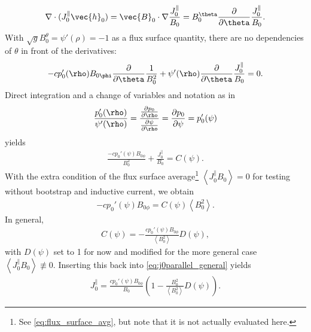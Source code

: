 \begin{gather}
  \divg(J_{0}^{\parallel} \vec{h}_{0}) = \vec{B}_{0} \cdot \grad \frac{J_{0}^{\parallel}}{B_{0}} = B_{0}^{\theta} \pd{\theta} \frac{J_{0}^{\parallel}}{B_{0}}.
\end{gather}
With $\sqrt{g} B_{0}^{\theta} = \psi'(\rho) = -1$ as a flux surface quantity, there are no dependencies of $\theta$ in front of the derivatives:
\begin{gather}
  -c p_{0}' (\rho) B_{0 \phi} \pd{\theta} \frac{1}{B_{0}^{2}} + \psi'(\rho) \pd{\theta} \frac{J_{0}^{\parallel}}{B_{0}} = 0.
\end{gather}
Direct integration and a change of variables and notation as in
\begin{gather}
  \frac{p_{0}'(\rho)}{\psi'(\rho)} = \frac{\pd[p_{0}]{\rho}}{\pd[\psi]{\rho}} = \pd[p_{0}]{\psi} = p_{0}'(\psi)
\end{gather}
yields
\begin{gather}
  \frac{-c p_{0}' (\psi) B_{0 \phi}}{B_{0}^{2}} + \frac{J_{0}^{\parallel}}{B_{0}} = C(\psi). \label{eq:j0parallel_general}
\end{gather}
With the extra condition of the flux surface average\footnote{See \cref{eq:flux_surface_avg}, but note that it is not actually evaluated here.} $\left\langle J_{0}^{\parallel} B_{0} \right\rangle = 0$ for testing without bootstrap and inductive current, we obtain
\begin{gather}
  -c p_{0}'(\psi) B_{0 \phi} = C(\psi) \left\langle B_{0}^{2} \right\rangle.
\end{gather}
In general, 
\begin{gather}
  C(\psi) = -\frac{c p_{0}'(\psi) B_{0 \phi}}{\left\langle B_{0}^{2} \right\rangle} D(\psi),
\end{gather}
with $D(\psi)$ set to 1 for now and modified for the more general case $\left\langle J_{0}^{\parallel} B_{0} \right\rangle \not\equiv 0$. Inserting this back into \cref{eq:j0parallel_general} yields
\begin{gather}
  J_{0}^{\parallel} = \frac{c p_{0}'(\psi) B_{0 \phi}}{B_{0}} \left( 1 - \frac{B_{0}^{2}}{\left\langle B_{0}^{2} \right\rangle} D(\psi) \right).
\end{gather}

